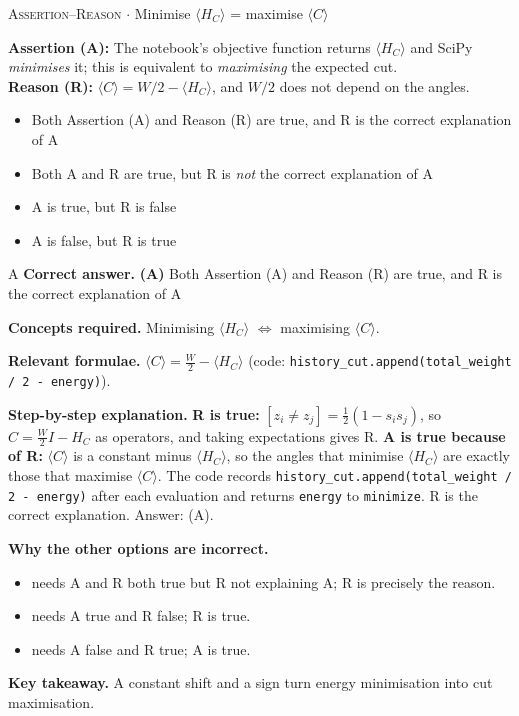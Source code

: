 \documentclass[11pt,a4paper]{article}
\newcommand{\optlabel}[1]{\textbf{(#1)}}
\newcommand{\correctlabel}[1]{\textcolor{okgreen}{\textbf{(#1)}\,\ding{51}}}
\newenvironment{qitem}[1]{\begin{list}{}{\setlength{\leftmargin}{3.3em}\setlength{\labelwidth}{3.1em}%
  \setlength{\labelsep}{0.2em}\setlength{\topsep}{3pt}\setlength{\parsep}{3pt}}\item[\textbf{Q.#1}\hfill]}{\end{list}}
\newcommand{\qsep}{\par\vspace{2pt}{\color{black!15}\hrule}\vspace{4pt}}
\newcommand{\qmeta}[2]{{\footnotesize\color{black!60}\textsc{#1} \;$\cdot$\; #2}\par}
\begin{document}
\begin{qitem}{53}
\qmeta{Assertion--Reason}{Minimise $\langle H_C\rangle$ = maximise $\langle C\rangle$}
\textbf{Assertion (A):} The notebook's objective function returns $\langle H_C\rangle$ and SciPy \emph{minimises} it; this is
equivalent to \emph{maximising} the expected cut.\\[1mm]
\textbf{Reason (R):} $\langle C\rangle = W/2 - \langle H_C\rangle$, and $W/2$ does not depend on the angles.
\begin{itemize}[leftmargin=2.6em, labelsep=0.4em, itemsep=2pt, topsep=3pt]
\item[\correctlabel{A}] Both Assertion (A) and Reason (R) are true, and R is the correct explanation of A
\item[\optlabel{B}] Both A and R are true, but R is \emph{not} the correct explanation of A
\item[\optlabel{C}] A is true, but R is false
\item[\optlabel{D}] A is false, but R is true
\end{itemize}
\end{qitem}
\begin{solbox}{A}
\textbf{\color{brand}Correct answer.} \textcolor{okgreen}{\textbf{(A)}} Both Assertion (A) and Reason (R) are true, and R is the correct explanation of A

\textbf{\color{brand}Concepts required.} Minimising $\langle H_C\rangle$ $\Leftrightarrow$ maximising $\langle C\rangle$.

\textbf{\color{brand}Relevant formulae.} $\langle C\rangle = \tfrac W2 - \langle H_C\rangle$ (code: \texttt{history\_cut.append(total\_weight / 2 - energy)}).

\textbf{\color{brand}Step-by-step explanation.} \textbf{R is true:} $[z_i \neq z_j] = \tfrac12(1 - s_is_j)$, so $C = \tfrac W2 I - H_C$ as operators, and taking expectations gives R.
\textbf{A is true because of R:} $\langle C\rangle$ is a constant minus $\langle H_C\rangle$, so the angles that minimise $\langle H_C\rangle$ are exactly
those that maximise $\langle C\rangle$. The code records \texttt{history\_cut.append(total\_weight / 2 - energy)} after each
evaluation and returns \texttt{energy} to \texttt{minimize}. R is the correct explanation. Answer: (A).

\textbf{\color{brand}Why the other options are incorrect.}
\begin{itemize}[leftmargin=2.4em, itemsep=1pt, topsep=2pt]
\item[\textbf{(B)}] needs A and R both true but R not explaining A; R is precisely the reason.
\item[\textbf{(C)}] needs A true and R false; R is true.
\item[\textbf{(D)}] needs A false and R true; A is true.
\end{itemize}
\textbf{\color{brand}Key takeaway.} A constant shift and a sign turn energy minimisation into cut maximisation.
\end{solbox}
\qsep
\end{document}
